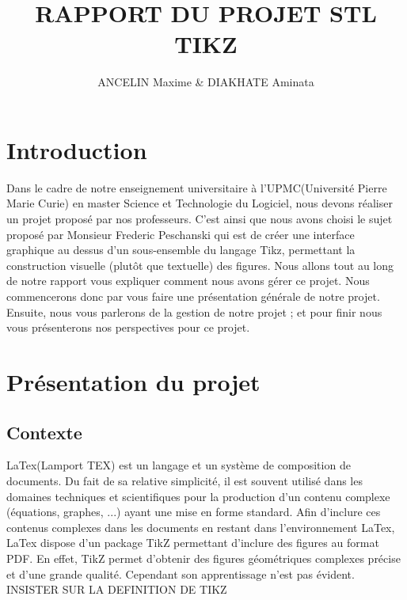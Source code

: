 \documentclass[a4paper]{report}
\title{RAPPORT DU PROJET STL \\ TIKZ}
\author{ANCELIN Maxime & DIAKHATE Aminata}
\begin{document}

 \maketitle
 \tableofcontents
 \newpage



 \newpage
 \section{Introduction}
  Dans le cadre de notre enseignement universitaire à l'UPMC(Université Pierre Marie Curie) en master Science et Technologie du Logiciel, nous devons réaliser un projet proposé par nos professeurs. C'est ainsi que nous avons choisi le sujet proposé par Monsieur Frederic Peschanski qui est de créer une interface graphique au dessus d'un sous-ensemble du langage Tikz, permettant la construction visuelle (plutôt que textuelle) des figures. 
  \newline
  Nous allons tout au long de notre rapport vous expliquer comment nous avons gérer ce projet. Nous commencerons donc par vous faire une présentation générale de notre projet. Ensuite, nous vous parlerons de la gestion de notre projet ; et pour finir nous vous présenterons nos perspectives pour ce projet.
  \section{Présentation du projet}
  \subsection{Contexte}
  LaTex(Lamport TEX) est un langage et un système de composition de documents. Du fait de sa relative simplicité, il est souvent utilisé dans les domaines techniques et scientifiques pour la production d'un contenu complexe (équations, graphes, ...) ayant une mise en forme standard. Afin d'inclure ces contenus complexes dans les documents en restant dans l'environnement LaTex, LaTex dispose d'un package TikZ permettant d'inclure des figures au format PDF. En effet, TikZ permet d'obtenir des figures géométriques complexes précise et d'une grande qualité. Cependant son apprentissage n'est pas évident. 
  \newline
  INSISTER SUR LA DEFINITION DE TIKZ
\end{document}
